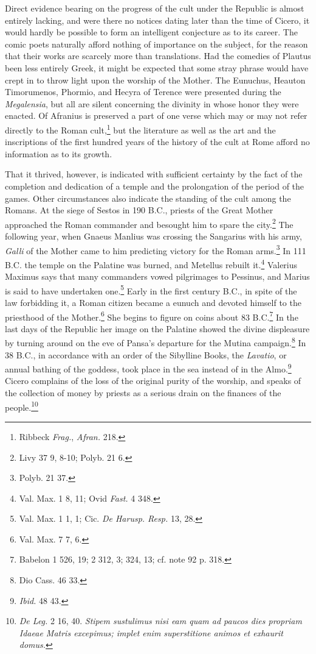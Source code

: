 \documentclass[a4paper, 11pt, oneside, polutonikogreek, english]{article}
\begin{document}
Direct evidence bearing on the progress of the cult under the Republic is almost entirely lacking, and were there no notices dating later than the time of Cicero, it would hardly be possible to form an intelligent conjecture as to its career. The comic poets naturally afford nothing of importance on the subject, for the reason that their works are scarcely more than translations. Had the comedies of Plautus been less entirely Greek, it might be expected that some stray phrase would have crept in to throw light upon the worship of the Mother. The Eunuchus, Heauton Timorumenos, Phormio, and Hecyra of Terence were presented during the \emph{Megalensia}, but all are silent concerning the divinity in whose honor they were enacted. Of Afranius is preserved a part of one verse which may or may not refer directly to the Roman cult,\footnote{Ribbeck \emph{Frag.}, \emph{Afran.} 218.} but the literature as well as the art and the inscriptions of the first hundred years of the history of the cult at Rome afford no information as to its growth.

That it thrived, however, is indicated with sufficient certainty by the fact of the completion and dedication of a temple and the prolongation of the period of the games. Other circumstances also indicate the standing of the cult among the Romans. At the siege of Sestos in 190 \textsc{B.C.}, priests of the Great Mother approached the Roman commander and besought him to spare the city.\footnote{Livy 37 9, 8-10; Polyb. 21 6.} The following year, when Gnaeus Manlius was crossing the Sangarius with his army, \emph{Galli} of the Mother came to him predicting victory for the Roman arms.\footnote{Polyb. 21 37.} In 111 \textsc{B.C.} the temple on the Palatine was burned, and Metellus rebuilt it.\footnote{Val. Max. 1 8, 11; Ovid \emph{Fast.} 4 348.} Valerius Maximus says that many commanders vowed pilgrimages to Pessinus, and Marius is said to have undertaken one.\footnote{Val. Max. 1 1, 1; Cic. \emph{De Harusp. Resp.} 13, 28.} Early in the first century \textsc{B.C.}, in spite of the law forbidding it, a Roman citizen became a eunuch and devoted himself to the priesthood of the Mother.\footnote{Val. Max. 7 7, 6.} She begins to figure on coins about 83 \textsc{B.C.}\footnote{Babelon 1 526, 19; 2 312, 3; 324, 13; cf. note 92 p. 318.} In the last days of the Republic her image on the Palatine showed the divine displeasure by turning around on the eve of Pansa's departure for the Mutina campaign.\footnote{Dio Cass. 46 33.} In 38 \textsc{B.C.}, in accordance with an order of the Sibylline Books, the \emph{Lavatio}, or annual bathing of the goddess, took place in the sea instead of in the Almo.\footnote{\emph{Ibid.} 48 43.} Cicero complains of the loss of the original purity of the worship, and speaks of the collection of money by priests as a serious drain on the finances of the people.\footnote{\emph{De Leg.} 2 16, 40. \emph{Stipem sustulimus nisi eam quam ad paucos dies propriam Idaeae Matris excepimus; implet enim superstitione animos et exhaurit domus.}}
\end{document}
